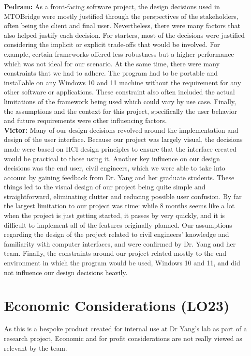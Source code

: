 \documentclass{article}
\begin{document}
\textbf{Pedram:} As a front-facing software project, the design decisions used in MTOBridge were mostly justified through the perspectives of the stakeholders, often being the 
client and final user. Nevertheless, there were many factors that also helped justify each decision. For starters, most of the decisions were justified considering the implicit 
or explicit trade-offs that would be involved. For example, certain frameworks offered less robustness but a higher performance which was not ideal for our scenario. 
At the same time, there were many constraints that we had to adhere. The program had to be portable and installable on any Windows 10 and 11 machine without the requirement 
for any other software or applications. These constraint also often included the actual limitations of the framework being used which could vary by use case. Finally, 
the assumptions and the context for this project, specifically the user behavior and future requirements were other influencing factors.\\

\textbf{Victor:} Many of our design decisions revolved around the implementation and design of the user interface. Because our project was largely visual, the decisions made 
were based on HCI design principles to ensure that the interface created would be practical to those using it. Another key influence on our design decisions was the end user, 
civil engineers, which we were able to take into account by gaining feedback from Dr. Yang and her graduate students. These things led to the visual design of our project being 
quite simple and straightforward, eliminating clutter and reducing possible user confusion. By far the largest limitation to our project was time: while 8 months seems like a 
lot when the project is just getting started, it passes by very quickly, and it is difficult to implement all of the features originally planned. Our assumptions regarding the 
design of the project related to civil engineers' knowledge and familiarity with computer interfaces, and were confirmed by Dr. Yang and her team. Finally, the constraints 
around our project related mostly to the end environment in which the program would be used, Windows 10 and 11, and did not influence our design decisions heavily. 

\section{Economic Considerations (LO23)}

As this is a bespoke product created for internal use at Dr Yang's lab as part of a research project, Economic and for profit considerations are not really viewed as relevant by
the team.
\end{document}
